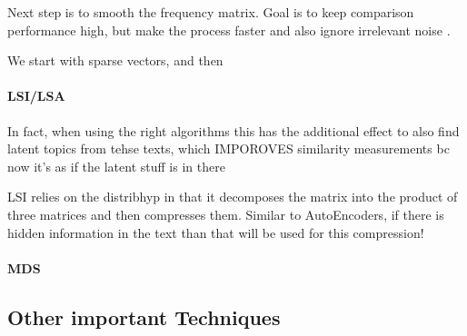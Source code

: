 Next step is to smooth the frequency matrix. Goal is to keep comparison performance high, but make the  process faster and also ignore irrelevant noise \cite{Turney2010}.

We start with sparse vectors, and then  \cite{Derrac2015}


\paragraph*{LSI/LSA}

\textcite{Deerwester}

In fact, when using the right algorithms this has the additional effect to also find latent topics from tehse texts, which IMPOROVES similarity measurements bc now it's as if the latent stuff is in there

LSI relies on the \gls{distribhyp} in that it decomposes the matrix into the product of three matrices and then compresses them. Similar to AutoEncoders, if there is hidden information in the text than that will be used for this compression! 

\paragraph*{MDS}
\label{sec:mds}


\subsection{Other important Techniques}



